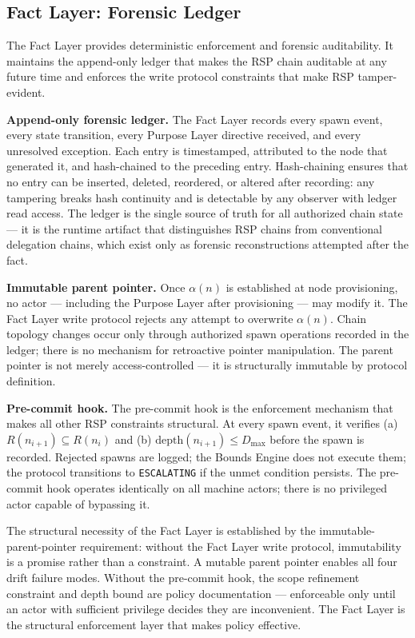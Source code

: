 \subsection{Fact Layer: Forensic Ledger}
\label{sec:rs-fact-ledger}

The Fact Layer provides deterministic enforcement and forensic auditability. It maintains the append-only ledger that makes the RSP chain auditable at any future time and enforces the write protocol constraints that make RSP tamper-evident.

\medskip
\noindent\textbf{Append-only forensic ledger.} The Fact Layer records every spawn event, every state transition, every Purpose Layer directive received, and every unresolved exception. Each entry is timestamped, attributed to the node that generated it, and hash-chained to the preceding entry. Hash-chaining ensures that no entry can be inserted, deleted, reordered, or altered after recording: any tampering breaks hash continuity and is detectable by any observer with ledger read access. The ledger is the single source of truth for all authorized chain state --- it is the runtime artifact that distinguishes RSP chains from conventional delegation chains, which exist only as forensic reconstructions attempted after the fact.

\medskip
\noindent\textbf{Immutable parent pointer.} Once $\alpha(n)$ is established at node provisioning, no actor --- including the Purpose Layer after provisioning --- may modify it. The Fact Layer write protocol rejects any attempt to overwrite $\alpha(n)$. Chain topology changes occur only through authorized spawn operations recorded in the ledger; there is no mechanism for retroactive pointer manipulation. The parent pointer is not merely access-controlled --- it is structurally immutable by protocol definition.

\medskip
\noindent\textbf{Pre-commit hook.} The pre-commit hook is the enforcement mechanism that makes all other RSP constraints structural. At every spawn event, it verifies (a) $R(n_{i+1}) \subseteq R(n_i)$ and (b) $\mathrm{depth}(n_{i+1}) \leq D_{\mathrm{max}}$ before the spawn is recorded. Rejected spawns are logged; the Bounds Engine does not execute them; the protocol transitions to \texttt{ESCALATING} if the unmet condition persists. The pre-commit hook operates identically on all machine actors; there is no privileged actor capable of bypassing it.

The structural necessity of the Fact Layer is established by the immutable-parent-pointer requirement: without the Fact Layer write protocol, immutability is a promise rather than a constraint. A mutable parent pointer enables all four drift failure modes. Without the pre-commit hook, the scope refinement constraint and depth bound are policy documentation --- enforceable only until an actor with sufficient privilege decides they are inconvenient. The Fact Layer is the structural enforcement layer that makes policy effective.

